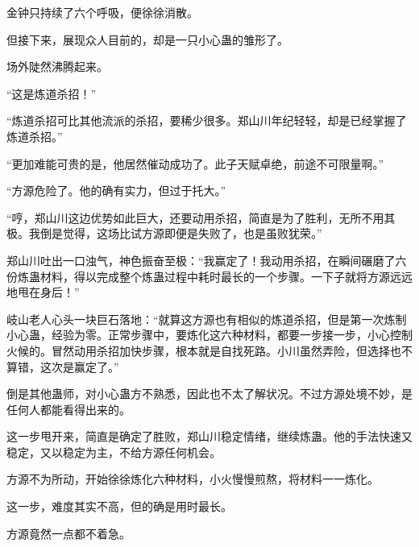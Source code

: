 \begin{this_body}
金钟只持续了六个呼吸，便徐徐消散。

但接下来，展现众人目前的，却是一只小心蛊的雏形了。

场外陡然沸腾起来。

“这是炼道杀招！”

“炼道杀招可比其他流派的杀招，要稀少很多。郑山川年纪轻轻，却是已经掌握了炼道杀招。”

“更加难能可贵的是，他居然催动成功了。此子天赋卓绝，前途不可限量啊。”

“方源危险了。他的确有实力，但过于托大。”

“哼，郑山川这边优势如此巨大，还要动用杀招，简直是为了胜利，无所不用其极。我倒是觉得，这场比试方源即便是失败了，也是虽败犹荣。”

郑山川吐出一口浊气，神色振奋至极：“我赢定了！我动用杀招，在瞬间碾磨了六份炼蛊材料，得以完成整个炼蛊过程中耗时最长的一个步骤。一下子就将方源远远地甩在身后！”

岐山老人心头一块巨石落地：“就算这方源也有相似的炼道杀招，但是第一次炼制小心蛊，经验为零。正常步骤中，要炼化这六种材料，都要一步接一步，小心控制火候的。冒然动用杀招加快步骤，根本就是自找死路。小川虽然弄险，但选择也不算错，这次是赢定了。”

倒是其他蛊师，对小心蛊方不熟悉，因此也不太了解状况。不过方源处境不妙，是任何人都能看得出来的。

这一步甩开来，简直是确定了胜败，郑山川稳定情绪，继续炼蛊。他的手法快速又稳定，又以稳定为主，不给方源任何机会。

方源不为所动，开始徐徐炼化六种材料，小火慢慢煎熬，将材料一一炼化。

这一步，难度其实不高，但的确是用时最长。

方源竟然一点都不着急。

\end{this_body}

